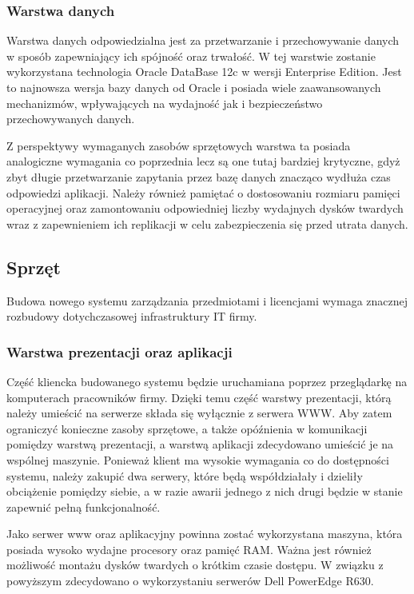 \subsubsection{Warstwa danych}

Warstwa danych odpowiedzialna jest za przetwarzanie i przechowywanie
danych w sposób zapewniający ich spójność oraz trwałość. W tej
warstwie zostanie wykorzystana technologia Oracle DataBase 12c w
wersji Enterprise Edition. Jest to najnowsza wersja bazy danych od
Oracle i posiada wiele zaawansowanych mechanizmów, wpływających na
wydajność jak i bezpieczeństwo przechowywanych danych.

Z perspektywy wymaganych zasobów sprzętowych warstwa ta posiada
analogiczne wymagania co poprzednia lecz są one tutaj bardziej
krytyczne, gdyż zbyt długie przetwarzanie zapytania przez bazę danych
znacząco wydłuża czas odpowiedzi aplikacji. Należy również pamiętać o
dostosowaniu rozmiaru pamięci operacyjnej oraz zamontowaniu
odpowiedniej liczby wydajnych dysków twardych wraz z zapewnieniem ich
replikacji w celu zabezpieczenia się przed utrata danych.

\subsection{Sprzęt}

Budowa nowego systemu zarządzania przedmiotami i licencjami wymaga
znacznej rozbudowy dotychczasowej infrastruktury IT firmy.

\subsubsection{Warstwa prezentacji oraz aplikacji}

Część kliencka budowanego systemu będzie uruchamiana poprzez
przeglądarkę na komputerach pracowników firmy. Dzięki temu część
warstwy prezentacji, którą należy umieścić na serwerze składa się
wyłącznie z serwera WWW. Aby zatem ograniczyć konieczne zasoby
sprzętowe, a także opóźnienia w komunikacji pomiędzy warstwą
prezentacji, a warstwą aplikacji zdecydowano umieścić je na wspólnej
maszynie. Ponieważ klient ma wysokie wymagania co do dostępności
systemu, należy zakupić dwa serwery, które będą współdziałały i
dzieliły obciążenie pomiędzy siebie, a w razie awarii jednego z nich
drugi będzie w stanie zapewnić pełną funkcjonalność.


Jako serwer www oraz aplikacyjny powinna zostać wykorzystana maszyna,
która posiada wysoko wydajne procesory oraz pamięć RAM. Ważna jest
również możliwość montażu dysków twardych o krótkim czasie dostępu. W
związku z powyższym zdecydowano o wykorzystaniu serwerów Dell
PowerEdge R630.

